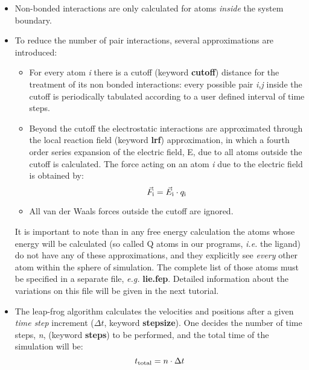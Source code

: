 \documentclass[a4paper,12pt]{article}
\begin{document}
\begin {itemize}
\item Non-bonded interactions are only calculated for atoms {\it inside} the system boundary.
\item To reduce the number of pair interactions, several approximations are introduced:
\begin {itemize}
\item For every atom {\it i} there is a cutoff (keyword {\bf cutoff}) distance for the treatment of its non bonded interactions: every possible pair {\it i,j} inside the cutoff is periodically tabulated according to a user defined interval of time steps.
\item Beyond the cutoff the electrostatic interactions are approximated through the local reaction field (keyword {\bf lrf}) approximation, in which a fourth order series expansion of the electric field, E, due to all atoms outside the cutoff is calculated. The force acting on an atom {\it i} due to the electric field is obtained by: $$\vec F_{\rm i} = \vec E_{\rm i} \cdot q_{\rm i}$$
\item All van der Waals forces outside the cutoff are ignored.
\end {itemize}
It is important to note than in any free energy calculation the
atoms whose energy will be calculated (so called Q atoms in our
programs, {\it i.e.} the ligand) do not have any of these
approximations, and they explicitly see {\it every} other atom
within the sphere of simulation. The complete list of those atoms
must be specified in a separate file, {\it e.g.} {\bf lie.fep}.
Detailed information about the variations on this file will be
given in the next tutorial.
\item The leap-frog algorithm calculates the velocities and positions after a given {\it time step} increment ($\Delta t$, keyword {\bf stepsize}). One decides the number of time steps, {\it n}, (keyword {\bf steps}) to be performed, and the total time of the simulation will be: $$ t_{\rm total} = n \cdot \Delta t$$
\end {itemize}
\end{document}
